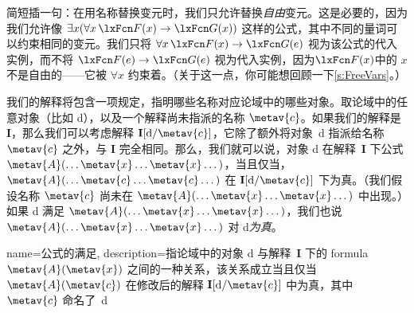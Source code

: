 
简短插一句：在用名称替换变元时，我们只允许替换\emph{自由}变元。这是必要的，因为我们允许像 $\exists x(\forall x\,\atom{F}{x} \eif
\atom{G}{x})$ 这样的公式，其中不同的量词可以约束相同的变元。我们只将 $\forall x\,\atom{F}{x} \eif \atom{G}{e}$ 视为该公式的代入实例，而不将 $\atom{F}{e} \eif
\atom{G}{e}$ 视为代入实例，因为$\atom{F}{x}$中的 $x$ 不是自由的——它被 $\forall x$ 约束着。（关于这一点，你可能想回顾一下\cref{s:FreeVars}。）

我们的解释将包含一项规定，指明哪些名称对应论域中的哪些对象。取论域中的任意对象（比如 d），以及一个解释尚未指派的名称 $\metav{c}$。如果我们的解释是 $\mathbf{I}$，那么我们可以考虑解释 $\mathbf{I}[\text{d}/\metav{c}]$，它除了额外将对象~d 指派给名称 $\metav{c}$ 之外，与 $\mathbf{I}$ 完全相同。那么，我们就可以说，对象 d 在解释~$\mathbf{I}$ 下公式 $\metav{A}(\dots\metav{x}\dots\metav{x}\dots)$，当且仅当，$\metav{A}(\dots\metav{c}\dots\metav{c}\dots)$ 在 $\mathbf{I}[\text{d}/\metav{c}]$ 下为真。（我们假设名称 $\metav{c}$ 尚未在 $\metav{A}(\dots\metav{x}\dots\metav{x}\dots)$ 中出现。）如果 d 满足 $\metav{A}(\dots\metav{x}\dots\metav{x}\dots)$，我们也说 $\metav{A}(\dots\metav{x}\dots\metav{x}\dots)$ 对 d\emph{为真}。


{
  name=公式的满足,
  description={指论域中的对象 d 与解释~$\mathbf{I}$ 下的 \gls{formula}~$\metav{A}(\metav{x})$ 之间的一种关系，该关系成立当且仅当$\metav{A}(\metav{c})$ 在修改后的解释 $\mathbf{I}[\text{d}/\metav{c}]$ 中为真，其中 $\metav{c}$ 命名了~d}
}

